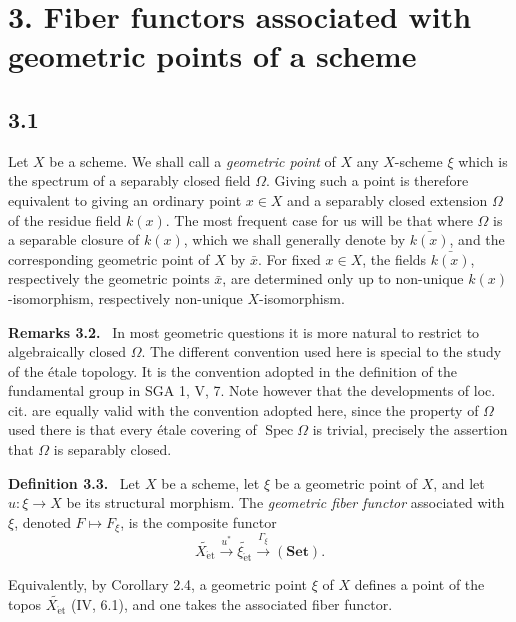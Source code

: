 \documentclass[11pt]{article}
\newcommand{\Spec}{\operatorname{Spec}}
\newcommand{\et}{\mathrm{\acute{e}t}}
\newcommand{\SGA}{SGA}
\newenvironment{statement}[1]{\par\medskip\noindent\textbf{#1.}\ }{\par\medskip}
\newenvironment{remarktext}[1]{\par\medskip\noindent\textbf{#1.}\ }{\par\medskip}
\begin{document}
\section*{3. Fiber functors associated with geometric points of a scheme}

\subsection*{3.1}
Let \(X\) be a scheme. We shall call a \emph{geometric point} of \(X\) any \(X\)-scheme \(\xi\) which is the spectrum of a separably closed field \(\Omega\). Giving such a point is therefore equivalent to giving an ordinary point \(x\in X\) and a separably closed extension \(\Omega\) of the residue field \(k(x)\). The most frequent case for us will be that where \(\Omega\) is a separable closure of \(k(x)\), which we shall generally denote by \(\bar{k(x)}\), and the corresponding geometric point of \(X\) by \(\bar x\). For fixed \(x\in X\), the fields \(\bar{k(x)}\), respectively the geometric points \(\bar x\), are determined only up to non-unique \(k(x)\)-isomorphism, respectively non-unique \(X\)-isomorphism.

\begin{remarktext}{Remarks 3.2}
In most geometric questions it is more natural to restrict to algebraically closed \(\Omega\). The different convention used here is special to the study of the \'etale topology. It is the convention adopted in the definition of the fundamental group in \SGA{} 1, V, 7. Note however that the developments of loc. cit. are equally valid with the convention adopted here, since the property of \(\Omega\) used there is that every \'etale covering of \(\Spec\Omega\) is trivial, precisely the assertion that \(\Omega\) is separably closed.
\end{remarktext}

\begin{statement}{Definition 3.3}
Let \(X\) be a scheme, let \(\xi\) be a geometric point of \(X\), and let \(u:\xi\to X\) be its structural morphism. The \emph{geometric fiber functor} associated with \(\xi\), denoted \(F\mapsto F_\xi\), is the composite functor
\[
\widetilde{X_{\et}}\xrightarrow{u^*}\widetilde{\xi_{\et}}\xrightarrow{\Gamma_\xi}(\mathbf{Set}).
\]
\end{statement}

Equivalently, by Corollary 2.4, a geometric point \(\xi\) of \(X\) defines a point of the topos \(\widetilde{X_{\et}}\) (IV, 6.1), and one takes the associated fiber functor.
\end{document}
